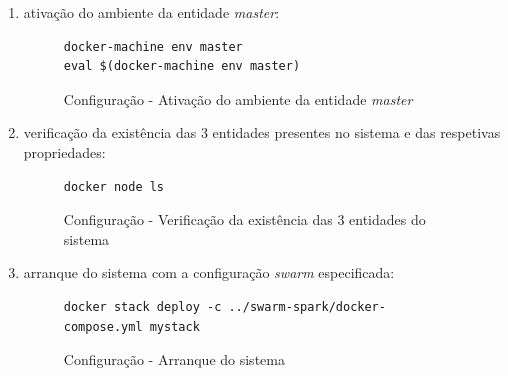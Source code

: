 \documentclass[a4paper]{report}
\begin{document}
{\begin{enumerate}[label=\textbf{\arabic*.}]
            \item ativação do ambiente da entidade \textsl{master}:
            \begin{figure}[H]
                \centering
                \begin{verbatim}
docker-machine env master
eval $(docker-machine env master)
                \end{verbatim}
                \caption{Configuração - Ativação do ambiente da entidade \textsl{master}}
                \label{fig:7}
            \end{figure}

            \item verificação da existência das 3 entidades presentes no sistema e das respetivas propriedades:
            \begin{figure}[H]
                \centering
                \begin{verbatim}
docker node ls
                \end{verbatim}
                \caption{Configuração - Verificação da existência das 3 entidades do sistema}
                \label{fig:8}
            \end{figure}

            \item arranque do sistema com a configuração \textit{swarm} especificada:
            \begin{figure}[H]
                \centering
                \begin{verbatim}
docker stack deploy -c ../swarm-spark/docker-compose.yml mystack
                \end{verbatim}
                \caption{Configuração - Arranque do sistema}
                \label{fig:9}
            \end{figure}


\end{enumerate}}
\end{document}
